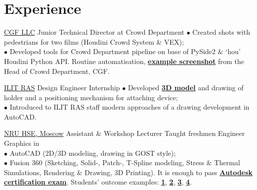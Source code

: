 \documentclass[]{cv-class}
\begin{document}
\begin{minipage}[t]{0.64\textwidth} 

\section{Experience}
    {\href{http://www.cgfww.com/}{CGF LLC}}
    {Junior Technical Director at Crowd Department}
    {\textcolor{bullet_col}{$\bullet$} Created shots with pedestrians for two films (Houdini Crowd System \& VEX); \\
    \textcolor{bullet_col}{$\bullet$} Developed tools for Crowd Department pipeline on base of PySide2 \& `hou' Houdini Python API. Routine automatisation, \href{https://drive.google.com/file/d/1qppj3VbpQOuFlPUC3lxqXcutf8H1pQz7/view?usp=sharing}{\textbf{example screenshot}} from the Head of Crowd Department, CGF.
    \\
    }

    {\href{https://crys.ras.ru}{ILIT RAS}}
    {Design Engineer Internship}
    {\textcolor{bullet_col}{$\bullet$} Developed \href{https://myhub.autodesk360.com/ue2971508/g/shares/SHabee1QT1a327cf2b7ada7a5a5e1c2f10c0}{\textbf{3D model}} and drawing of holder and a positioning mechanism for attaching device;\\
    \textcolor{bullet_col}{$\bullet$} Introduced to ILIT RAS staff modern approaches of a drawing development in AutoCAD.
    \\}

    {\href{https://www.hse.ru/en/}{NRU HSE, Moscow}}
    {Assistant \& Workshop Lecturer}
    {Taught freshmen Engineer Graphics in\\
    \textcolor{bullet_col}{$\bullet$} AutoCAD (2D/3D modeling, drawing in GOST style); \\
    \textcolor{bullet_col}{$\bullet$} Fusion 360 (Sketching, Solid-, Patch-, T-Spline modeling, Stress \& Thermal Simulations, Rendering \& Drawing, 3D Printing). It is enough to pass  \href{http://downloads.certiport.com/marketing/Autodesk/doc/ACU_Fusion_360.pdf}{\textbf{Autodesk certification exam}}. Students' outcome  examples: \href{https://gallery.autodesk.com/projects/mountain-bike-2}{\textbf{1}}, \href{https://gallery.autodesk.com/projects/corvette-c6}{\textbf{2}}, \href{https://gallery.autodesk.com/projects/stranded-beast}{\textbf{3}}, \href{https://gallery.autodesk.com/projects/star-wars-arc-170}{\textbf{4}}.
    \\}


\end{minipage}
\end{document}
